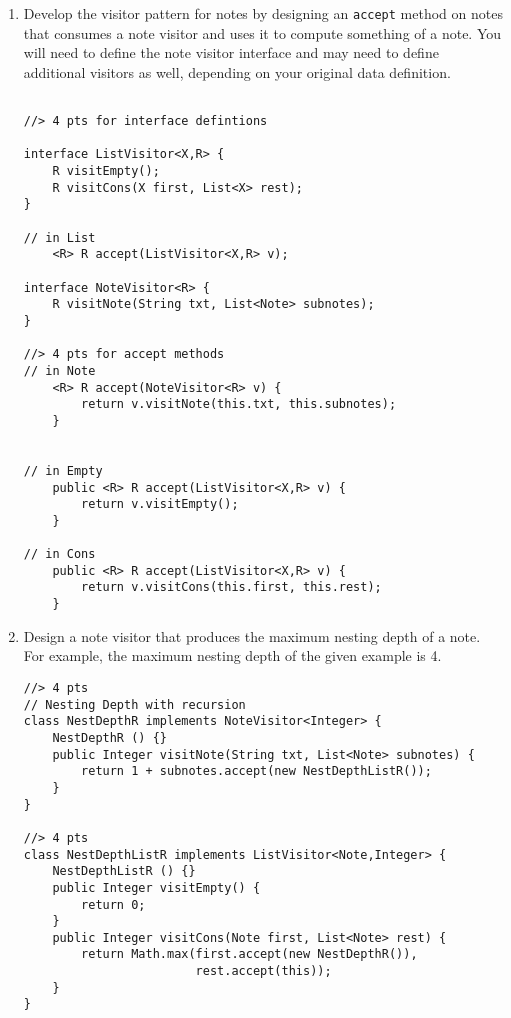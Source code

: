 \documentclass[12pt]{article}                   %
\newenvironment{solution}{\color{Red}}{}
\begin{document}
\begin{problem}
\begin{enumerate}
\newpage

\noindent
\item Develop the visitor pattern for notes by designing
  an \texttt{accept} method on notes that
  consumes a note visitor and uses it to compute something of a note.
  You will need to define the note visitor interface and may need to
  define additional visitors as well, depending on your original data
  definition.

\begin{solution}
\begin{verbatim}

//> 4 pts for interface defintions

interface ListVisitor<X,R> {
    R visitEmpty();
    R visitCons(X first, List<X> rest);
}

// in List
    <R> R accept(ListVisitor<X,R> v);

interface NoteVisitor<R> {
    R visitNote(String txt, List<Note> subnotes);
}

//> 4 pts for accept methods
// in Note
    <R> R accept(NoteVisitor<R> v) {
        return v.visitNote(this.txt, this.subnotes);
    }


// in Empty
    public <R> R accept(ListVisitor<X,R> v) {
        return v.visitEmpty();
    }

// in Cons
    public <R> R accept(ListVisitor<X,R> v) {
        return v.visitCons(this.first, this.rest);
    }
\end{verbatim}
\end{solution}

\newpage

\noindent
\item Design a note visitor that produces the maximum nesting depth of
  a note.  For example, the maximum nesting depth of the given example
  is 4.


\begin{solution}
\begin{verbatim}
//> 4 pts
// Nesting Depth with recursion
class NestDepthR implements NoteVisitor<Integer> {
    NestDepthR () {}
    public Integer visitNote(String txt, List<Note> subnotes) {
        return 1 + subnotes.accept(new NestDepthListR());
    }
}

//> 4 pts
class NestDepthListR implements ListVisitor<Note,Integer> {
    NestDepthListR () {}
    public Integer visitEmpty() {
        return 0;
    }
    public Integer visitCons(Note first, List<Note> rest) {
        return Math.max(first.accept(new NestDepthR()),
                        rest.accept(this));
    }
}
\end{verbatim}
\end{solution}


\end{enumerate}
\end{problem}
\end{document}
